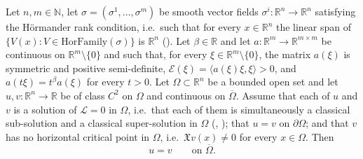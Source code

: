\begin{corollary}
Let $n,m\in\mathbb{N}$, let $\sigma=(\sigma^1,\dots,\sigma^m)$ be smooth vector fields
$\sigma^i:\mathbb{R}^n\to\mathbb{R}^n$ satisfying the H\"ormander rank condition, i.e.\ such that
for every $x\in\mathbb{R}^n$ the linear span of $\{V(x):V\in\mathrm{HorFamily}(\sigma)\}$ is
$\mathbb{R}^n$ (). Let $\beta\in\mathbb{R}$ and let
$a:\mathbb{R}^m\to\mathbb{R}^{m\times m}$ be continuous on $\mathbb{R}^m\setminus\{0\}$ and such
that, for every $\xi\in\mathbb{R}^m\setminus\{0\}$, the matrix $a(\xi)$ is symmetric and positive
semi-definite, $\mathcal{E}(\xi)=\langle a(\xi)\xi,\xi\rangle>0$, and $a(t\xi)=t^\beta a(\xi)$ for
every $t>0$. Let $\Omega\subset\mathbb{R}^n$ be a bounded open set and let
$u,v:\mathbb{R}^n\to\mathbb{R}$ be of class $C^2$ on $\Omega$ and continuous on $\overline\Omega$.
Assume that each of $u$ and $v$ is a solution of $\mathcal{L}=0$ in $\Omega$, i.e.\ that each of
them is simultaneously a classical sub-solution and a classical super-solution in $\Omega$
(, ); that $u=v$ on $\partial\Omega$; and
that $v$ has no horizontal critical point in $\Omega$, i.e.\ $\mathfrak{X}v(x)\neq0$ for every
$x\in\Omega$. Then
$$u=v\qquad\text{on }\overline\Omega .$$
\end{corollary}

